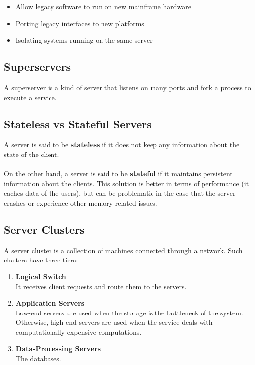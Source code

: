 \documentclass{article}
\begin{document}
\begin{itemize}
	\item Allow legacy software to run on new mainframe hardware
	\item Porting legacy interfaces to new platforms
	\item Isolating systems running on the same server
\end{itemize}

\subsection{Superservers}
A superserver is a kind of server that listens on many ports and fork a process to execute a service.

\subsection{Stateless vs Stateful Servers}
A server is said to be \textbf{stateless} if it does not keep any information about the state of the client. \\ \\
On the other hand, a server is said to be \textbf{stateful} if it maintains persistent information about the clients. This solution is better in terms of performance (it caches data of the users), but can be problematic in the case that the server crashes or experience other memory-related issues.

\subsection{Server Clusters}
A server cluster is a collection of machines connected through a network. Such clusters have three tiers:

\begin{enumerate}
	\item \textbf{Logical Switch} \\
	It receives client requests and route them to the servers.
	
	\item \textbf{Application Servers} \\
	Low-end servers are used when the storage is the bottleneck of the system. Otherwise, high-end servers are used when the service deals with computationally expensive computations.
	
	\item \textbf{Data-Processing Servers} \\
	The databases.
\end{enumerate}
\end{document}
